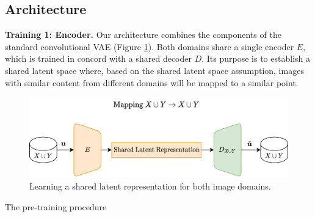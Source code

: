 \documentclass{article}
\begin{document}
\subsection{Architecture}
\textbf{Training 1: Encoder.} Our architecture combines the components of the standard convolutional VAE (Figure \ref{fig:pretrain}). Both domains share a single encoder $E$, which is trained in concord with a shared decoder $D$. Its purpose is to establish a shared latent space where, based on the shared latent space assumption, images with similar content from different domains will be mapped to a similar point.
\begin{figure}[H]
  \centering
  \includegraphics[width=0.7\linewidth]{report/assets/pretrain.png}
  \caption{Learning a shared latent representation for both image domains.}
  \label{fig:pretrain}
\end{figure}
\begin{algorithm}[H]
  \caption{The pre-training procedure}\label{alg:pre-train}
  \begin{algorithmic}
    
    
    
    
  \end{algorithmic}
  \end{algorithm}
\end{document}
